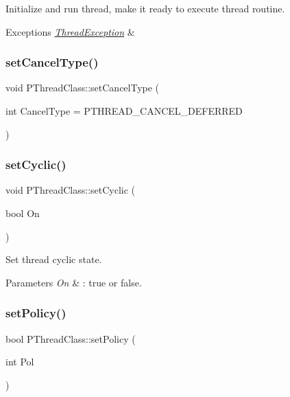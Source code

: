 Initialize and run thread, make it ready to execute thread routine. 
\begin{DoxyExceptions}{Exceptions}
{\em \hyperlink{classThreadException}{Thread\+Exception}} & \\
\hline
\end{DoxyExceptions}
\mbox{\label{classPThreadClass_a7d320ee54f3a8f26fc4a3245c36f7df6}} 
\subsubsection{\texorpdfstring{set\+Cancel\+Type()}{setCancelType()}}
{\footnotesize\ttfamily void P\+Thread\+Class\+::set\+Cancel\+Type (\begin{DoxyParamCaption}\item[{int}]{Cancel\+Type = {\ttfamily PTHREAD\+\_\+CANCEL\+\_\+DEFERRED} }\end{DoxyParamCaption})\hspace{0.3cm}{\ttfamily [inline]}}

\mbox{\label{classPThreadClass_ae217dc6602148a3a5be79089089dc807}} 
\subsubsection{\texorpdfstring{set\+Cyclic()}{setCyclic()}}
{\footnotesize\ttfamily void P\+Thread\+Class\+::set\+Cyclic (\begin{DoxyParamCaption}\item[{bool}]{On }\end{DoxyParamCaption})}

Set thread cyclic state. 
\begin{DoxyParams}{Parameters}
{\em On} & \+: true or false. \\
\hline
\end{DoxyParams}
\mbox{\label{classPThreadClass_a9fd180b8c007384057618c2c5111e834}} 
\subsubsection{\texorpdfstring{set\+Policy()}{setPolicy()}}
{\footnotesize\ttfamily bool P\+Thread\+Class\+::set\+Policy (\begin{DoxyParamCaption}\item[{int}]{Pol }\end{DoxyParamCaption})}

